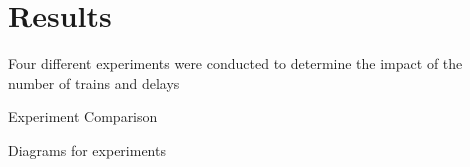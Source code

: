 \section{Results}

Four different experiments were conducted to determine the impact of the number
of trains and delays 

\begin{sidewaystable}
    \centering
    \caption{Experiment Comparison}
    
\end{sidewaystable}

Diagrams for experiments

